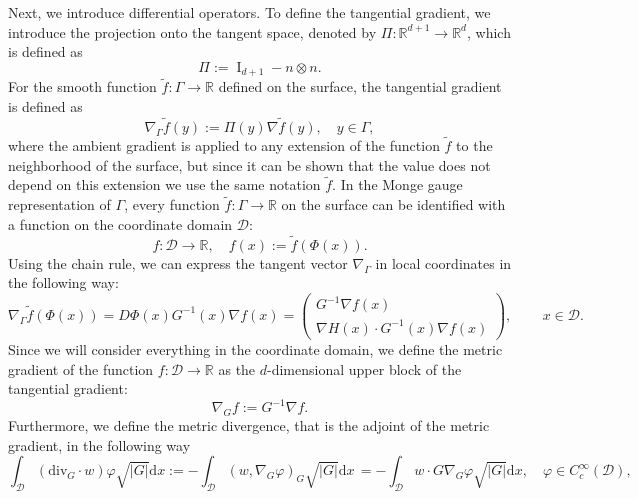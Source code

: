 \documentclass[11pt, a4paper]{article}
\newcommand{\mathd}{\mathrm{d}}
\begin{document}
Next, we introduce differential operators. To define the tangential gradient, we introduce the projection onto the tangent space, denoted by
$\Pi:\mathbb{R}^{d+1} \to \mathbb{R}^d$, which is defined
as
\[ \Pi := \operatorname{I}_{d + 1} - n \otimes n .\]
For the smooth function $\tilde{f}:\Gamma \to \mathbb{R}$ defined on the surface, the tangential gradient is defined as
\begin{equation}\label{eq:tangential-gradient}
    \nabla_\Gamma \tilde{f}(y) := \Pi(y) \nabla \tilde{f}(y), \quad y \in \Gamma,
\end{equation}
where the ambient gradient is applied to any extension of the function $\tilde{f}$
to the neighborhood of the surface, but since it can be shown that the value does not depend on this extension we use the same notation $\tilde{f}$. In the Monge gauge representation of $\Gamma$, every function $\tilde{f}:\Gamma \to \mathbb{R}$  on the surface can be identified with a function on the coordinate domain $\mathcal{D}$:
\begin{equation*}
    {f}:\mathcal{D} \to \mathbb{R}, \quad {f}(x) := \tilde{f}(\Phi(x)) . 
\end{equation*}
Using the chain rule, we can express the tangent vector $\nabla_\Gamma$ in local coordinates in the following way:
\begin{equation*}
    \nabla_\Gamma \tilde{f}(\Phi(x)) = D\Phi(x) G^{-1}(x) \nabla{f}(x)= \begin{pmatrix}
        G^{-1} \nabla {f}(x) \\
        \nabla H (x)   \cdot G^{-1}(x) \nabla {f} (x)
         \end{pmatrix}, \, \qquad x \in \mathcal{D} .
\end{equation*}
Since we will consider everything in the coordinate domain, we define the metric gradient of the function $f:\mathcal{D}\to \mathbb{R}$ as the $d$-dimensional upper block of the tangential gradient:
\begin{equation}\label{nablaG}
\nabla_G f := G^{-1}\nabla f .
\end{equation}
Furthermore, we define the metric divergence, that is the adjoint of the metric gradient, in the following way
\begin{equation*}
    \int_\mathcal{D} (\text{div}_G\cdot w) \varphi \sqrt{ | G |} {\mathd x} := -  \int_\mathcal{D} (w,\nabla_G \varphi)_G \sqrt{ | G |} {\mathd x} \,= - \int_\mathcal{D} w
   \cdot G \nabla_G \varphi \sqrt{ | G |} {\mathd x}, \quad \varphi \in C^{\infty}_c
   (\mathcal{D}),
\end{equation*}
\end{document}
